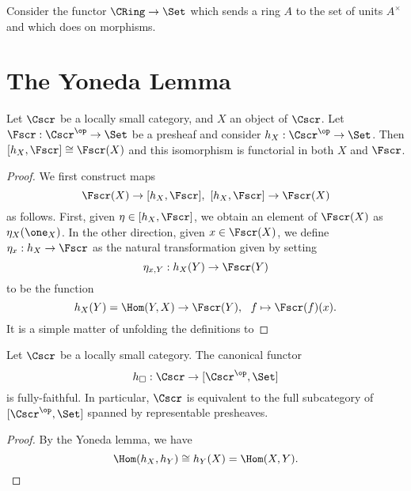 \begin{example}
  Consider the functor $\CRing \to \Set$ which sends a ring $A$ to the set of units $A^{\times}$ and which does  on morphisms.
\end{example}

\section{The Yoneda Lemma}

\begin{theorem}
  Let $\Cscr$ be a locally small category, and $X$ an object of $\Cscr$.
  Let $\Fscr : \Cscr^{\op} \to \Set$ be a presheaf and consider $h_{X} : \Cscr^{\op} \to \Set$.
  Then $[h_{X},\Fscr] \cong \Fscr(X)$ and this isomorphism is functorial in both $X$ and $\Fscr$.
\end{theorem}
\begin{proof}
  We first construct maps
  \[ \Fscr(X) \to [h_{X},\Fscr], \ [h_{X},\Fscr] \to \Fscr(X) \]
  as follows.
  First, given $\eta \in [h_{X},\Fscr]$, we obtain an element of $\Fscr(X)$ as $\eta_{X}(\one_{X})$.
  In the other direction, given $x \in \Fscr(X)$, we define $\eta_{x} : h_{X} \to \Fscr$ as the natural transformation given by setting
  \[ \eta_{x,Y} : h_{X}(Y) \to \Fscr(Y) \]
  to be the function
  \[ h_{X}(Y) = \Hom(Y,X) \to \Fscr(Y), \ \ f \mapsto \Fscr(f)(x). \]
  It is a simple matter of unfolding the definitions to 
\end{proof}

\begin{corollary}
  Let $\Cscr$ be a locally small category.
  The canonical functor
  \[ h_{\square} : \Cscr \to [\Cscr^{\op},\Set] \]
  is fully-faithful.
  In particular, $\Cscr$ is equivalent to the full subcategory of $[\Cscr^{\op},\Set]$ spanned by representable presheaves.
\end{corollary}
\begin{proof}
  By the Yoneda lemma, we have
  \[ \Hom(h_{X},h_{Y}) \cong h_{Y}(X) = \Hom(X,Y). \]
\end{proof}


